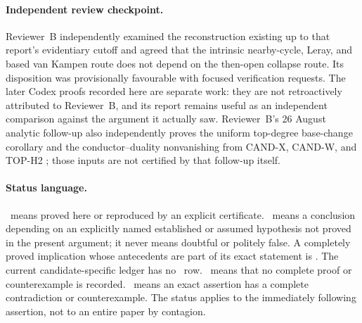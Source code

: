 \paragraph{Independent review checkpoint.}
Reviewer~B independently examined the reconstruction existing up to that
report's evidentiary cutoff and agreed that the intrinsic nearby-cycle,
Leray, and based van Kampen route does not depend on the then-open collapse
route.
Its disposition was provisionally favourable with focused verification
requests.  The later Codex proofs recorded here are separate work: they are
not retroactively attributed to Reviewer~B, and its report remains useful as
an independent comparison against the argument it actually saw.  Reviewer~B's
26 August analytic follow-up also independently proves the uniform
top-degree base-change corollary and the conductor--duality nonvanishing from
CAND-X, CAND-W, and TOP-H2 \cite{ReviewerBValidation2026}; those inputs are
not certified by that follow-up itself.

\paragraph{Status language.}
\Verified\ means proved here or reproduced by an explicit certificate.
\Conditional\ means a conclusion depending on an explicitly named
established or assumed hypothesis not proved in the present argument; it
never means doubtful or politely false.  A completely proved implication
whose antecedents are part of its exact statement is \Verified.  The current
candidate-specific ledger has no \Conditional\ row.  \Open\ means that no
complete proof or counterexample is recorded.  \Refuted\ means an exact
assertion has a complete contradiction or counterexample.  The status applies
to the immediately following assertion, not to an entire paper by contagion.
